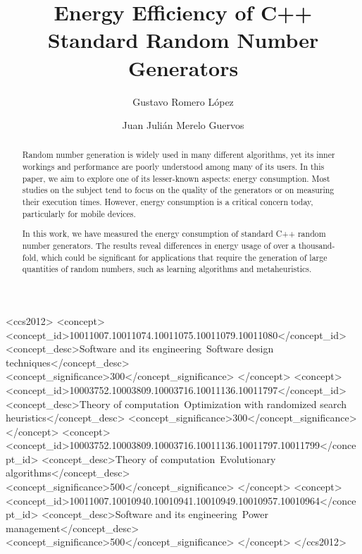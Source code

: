 \documentclass[dvipsnames,format=sigconf]{acmart}
\title{Energy Efficiency of C++ Standard Random Number Generators}
\author{Gustavo Romero López}
\affiliation{%
  \institution{Universidad de Granada}
  \streetaddress{Avenida del Hospicio, s/n}
  \postcode{18010}
  \city{Granada}
  \state{Andalucía}
  \country{Spain}
}
\author{Juan Julián Merelo Guervos}
\affiliation{%
  \institution{Universidad de Granada}
  \streetaddress{Avenida del Hospicio, s/n}
  \postcode{18010}
  \city{Granada}
  \state{Andalucía}
  \country{Spain}
}
\begin{document}
\begin{abstract}
  Random number generation is widely used in many different algorithms, yet its inner workings and performance are poorly understood among many of its users. In this paper, we aim to explore one of its lesser-known aspects: energy consumption. Most studies on the subject tend to focus on the quality of the generators or on measuring their execution times. However, energy consumption is a critical concern today, particularly for mobile devices.

  In this work, we have measured the energy consumption of standard C++ random number generators. The results reveal differences in energy usage of over a thousand-fold, which could be significant for applications that require the generation of large quantities of random numbers, such as learning algorithms and metaheuristics.
\end{abstract}

%
%
\begin{CCSXML}
<ccs2012>
   <concept>
       <concept_id>10011007.10011074.10011075.10011079.10011080</concept_id>
       <concept_desc>Software and its engineering~Software design techniques</concept_desc>
       <concept_significance>300</concept_significance>
       </concept>
   <concept>
       <concept_id>10003752.10003809.10003716.10011136.10011797</concept_id>
       <concept_desc>Theory of computation~Optimization with randomized search heuristics</concept_desc>
       <concept_significance>300</concept_significance>
       </concept>
   <concept>
       <concept_id>10003752.10003809.10003716.10011136.10011797.10011799</concept_id>
       <concept_desc>Theory of computation~Evolutionary algorithms</concept_desc>
       <concept_significance>500</concept_significance>
       </concept>
   <concept>
       <concept_id>10011007.10010940.10010941.10010949.10010957.10010964</concept_id>
       <concept_desc>Software and its engineering~Power management</concept_desc>
       <concept_significance>500</concept_significance>
       </concept>
 </ccs2012>
\end{CCSXML}

\end{document}
